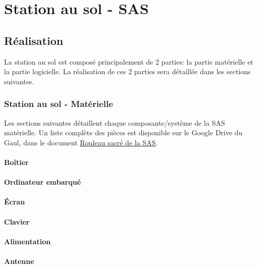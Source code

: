 \chapter{Station au sol - SAS}
\label{chap:sas}

\section{Réalisation}

La station au sol est composé principalement de 2 parties: la partie matérielle
et la partie logicielle. La réalisation de ces 2 parties sera détaillée dans
les sections suivantes.

\subsection{Station au sol - Matérielle}

Les sections suivantes détaillent chaque composante/système de la SAS
matérielle. Un liste complète des pièces est disponible sur le Google Drive du
Gaul, dans le document \href{https://drive.google.com/open?id=1WfV-Swc37Ih476rmRLYdwrBWRaUo8ZzXshS-LzYTQF4}{Rouleau sacré de la SAS}.

\subsubsection{Boîtier}


\subsubsection{Ordinateur embarqué}



\subsubsection{Écran}



\subsubsection{Clavier}



\subsubsection{Alimentation}



\subsubsection{Antenne}



